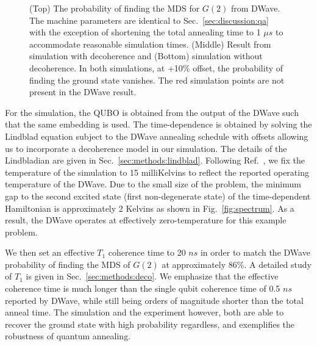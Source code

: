 \documentclass[prd,twocolumn,tightenlines,preprintnumbers,showpacs,superscriptaddress,notitlepage,nofootinbib,eqsecnum,floatfix,longbibliography]{revtex4}
\begin{document}
\begin{figure}
    \caption{ (Top) The probability of finding the MDS for $G(2)$ from DWave.
The machine parameters are identical to Sec.~\ref{sec:discussion:qa} with the exception of shortening the total annealing time to 1 $\mu s$ to accommodate reasonable simulation times.
(Middle) Result from simulation with decoherence and (Bottom) simulation without decoherence.
In both simulations, at +10\% offset, the probability of finding the ground state vanishes.
The red simulation points are not present in the DWave result.}
    \label{fig:dwave1us}
\end{figure}

For the simulation, the QUBO is obtained from the output of the DWave such that the same embedding is used.
The time-dependence is obtained by solving the Lindblad equation subject to the DWave annealing schedule with offsets allowing us to incorporate a decoherence model in our simulation.
The details of the Lindbladian are given in Sec.~\ref{sec:methods:lindblad}.
Following Ref.~\cite{}, we fix the temperature of the simulation to 15 milliKelvins to reflect the reported operating temperature of the DWave.
Due to the small size of the problem, the minimum gap to the second excited state (first non-degenerate state) of the time-dependent Hamiltonian is approximately 2 Kelvins as shown in Fig.~\ref{fig:spectrum}.
As a result, the DWave operates at effectively zero-temperature for this example problem.

We then set an effective $T_1$ coherence time to 20 $ns$ in order to match the DWave probability of finding the MDS of $G(2)$ at approximately 86\%.
A detailed study of $T_1$ is given in Sec.~\ref{sec:methods:deco}.
We emphasize that the effective coherence time is much longer than the single qubit coherence time of 0.5 $ns$ reported by DWave, while still being orders of magnitude shorter than the total anneal time.
The simulation and the experiment however, both are able to recover the ground state with high probability regardless, and exemplifies the robustness of quantum annealing.
\end{document}

